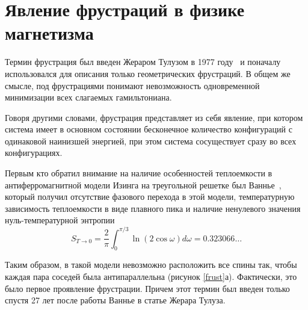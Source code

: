 \section{Явление фрустраций в физике магнетизма}\label{sec:ch1/sec3}

Термин \guillemotleft фрустрация\guillemotright \hspace{1pt} был введен Жераром Тулузом в 1977 году~\cite{toulouse1977, vannimenus1977} и поначалу использовался для описания только геометрических фрустраций. 
В общем же смысле, под фрустрациями понимают невозможность одновременной минимизации всех слагаемых гамильтониана.

Говоря другими словами, фрустрация представляет из себя явление, при котором система имеет в основном состоянии бесконечное количество конфигураций с одинаковой наинизшей энергией, при этом система сосуществует сразу во всех конфигурациях.


Первым кто обратил внимание на наличие особенностей теплоемкости в антиферромагнитной модели Изинга на треугольной решетке был Ваннье~\cite{wannier1950}, который получил отсутствие фазового перехода в этой модели, температурную зависимость теплоемкости в виде плавного пика и наличие ненулевого значения нуль-температурной энтропии 
\begin{equation}
S_{T\rightarrow 0} = \frac{2}{\pi} \int_{0}^{\pi/3} \ln (2 \cos \omega) d\omega = 0.323066\dots
\label{wannier}
\end{equation}

Таким образом, в такой модели невозможно расположить все спины так, чтобы каждая пара соседей была антипараллельна (рисунок \ref{frust}а). Фактически, это было первое проявление фрустрации. Причем этот термин был введен только спустя 27 лет после работы Ваннье в статье Жерара Тулуза.


